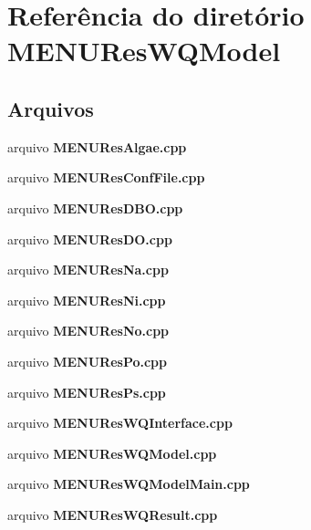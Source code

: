 \section{Referência do diretório M\+E\+N\+U\+Res\+W\+Q\+Model}
\label{dir_a3a1653c5a41ad3d3b0a2bd8d248a0f8}
\subsection*{Arquivos}
\begin{DoxyCompactItemize}
\item 
arquivo {\bf M\+E\+N\+U\+Res\+Algae.\+cpp}
\item 
arquivo {\bf M\+E\+N\+U\+Res\+Conf\+File.\+cpp}
\item 
arquivo {\bf M\+E\+N\+U\+Res\+D\+B\+O.\+cpp}
\item 
arquivo {\bf M\+E\+N\+U\+Res\+D\+O.\+cpp}
\item 
arquivo {\bf M\+E\+N\+U\+Res\+Na.\+cpp}
\item 
arquivo {\bf M\+E\+N\+U\+Res\+Ni.\+cpp}
\item 
arquivo {\bf M\+E\+N\+U\+Res\+No.\+cpp}
\item 
arquivo {\bf M\+E\+N\+U\+Res\+Po.\+cpp}
\item 
arquivo {\bf M\+E\+N\+U\+Res\+Ps.\+cpp}
\item 
arquivo {\bf M\+E\+N\+U\+Res\+W\+Q\+Interface.\+cpp}
\item 
arquivo {\bf M\+E\+N\+U\+Res\+W\+Q\+Model.\+cpp}
\item 
arquivo {\bf M\+E\+N\+U\+Res\+W\+Q\+Model\+Main.\+cpp}
\item 
arquivo {\bf M\+E\+N\+U\+Res\+W\+Q\+Result.\+cpp}
\end{DoxyCompactItemize}
